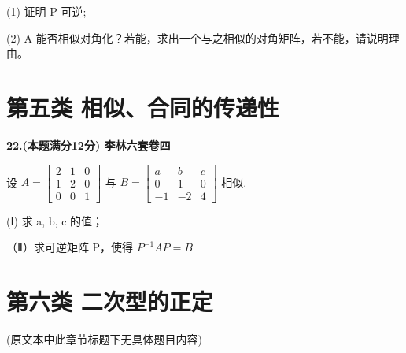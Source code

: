 \documentclass[a4paper,12pt]{article}
\begin{document}
(1) 证明 P 可逆;

(2) A 能否相似对角化？若能，求出一个与之相似的对角矩阵，若不能，请说明理由。

\section{第五类 相似、合同的传递性}

\textbf{22.(本题满分12分) 李林六套卷四}

设 $A = \begin{bmatrix} 2 & 1 & 0 \\ 1 & 2 & 0 \\ 0 & 0 & 1 \end{bmatrix}$ 与 $B = \begin{bmatrix} a & b & c \\ 0 & 1 & 0 \\ -1 & -2 & 4 \end{bmatrix}$ 相似.

(Ⅰ) 求 a, b, c 的值；

（Ⅱ）求可逆矩阵 P，使得 $P^{-1}AP=B$

\section{第六类 二次型的正定}
(原文本中此章节标题下无具体题目内容)
\end{document}
